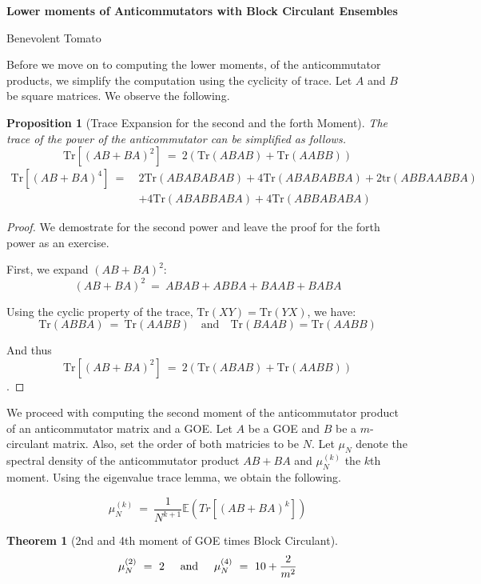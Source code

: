 \documentclass{article}
\newcommand{\textAnd}{
    {
        \hspace{5mm}
        \textrm{and}
        \hspace{5mm}
    }
}
\newtheorem{theorem}{Theorem}
\newtheorem{prop}{Proposition}
\begin{document}
\begin{center}
    \Large
    \textbf{Lower moments of Anticommutators with Block Circulant Ensembles}

    \large
    Benevolent Tomato
\end{center}


Before we move on to computing the lower moments, of the 
anticommutator products, we simplify the computation using the 
cyclicity of trace. 
Let \(A\) and \(B\) be square matrices. We observe the following. 

\begin{prop}[Trace Expansion for the second and the forth Moment]
The trace of the power of the anticommutator can be simplified as follows. 
\[
\text{Tr}[(AB + BA)^2]\ =\ 2(\text{Tr}(ABAB) + \text{Tr}(AABB))
\]
\[
\begin{aligned}
\text{Tr}[(AB + BA)^4] \ =\ & 2 \text{Tr}(ABABABAB) + 4 \text{Tr}(ABABABBA) + 2 \text{tr}(ABBAABBA) \\
& + 4 \text{Tr}(ABABBABA) + 4 \text{Tr}(ABBABABA)
\end{aligned}
\]
\end{prop}
\begin{proof}
We demostrate for the second power and leave the proof for the forth 
power as an exercise. 

First, we expand \((AB + BA)^2\):
\[
(AB + BA)^2 \ =\  ABAB + ABBA + BAAB + BABA
\]

Using the cyclic property of the trace, \(\text{Tr}(XY) = \text{Tr}(YX)\), we have:
\[
\text{Tr}(ABBA) \ =\ \text{Tr}(AABB) \quad \text{and} \quad \text{Tr}(BAAB) = \text{Tr}(AABB)
\]

And thus 
\[
\text{Tr}[(AB + BA)^2] \ =\ 2(\text{Tr}(ABAB) + \text{Tr}(AABB))
\]. 

\end{proof}

We proceed with computing the second moment of the 
anticommutator product of an anticommutator matrix 
and a GOE. Let $A$ be a GOE and $B$ be a $m$-circulant matrix. 
Also, set the order of both matricies to be $N$. 
Let $\mu_N$ denote the spectral density of the anticommutator product 
$AB + BA$ and $\mu_N^{(k)}$ the $k$th moment. 
Using 
the eigenvalue trace lemma, we obtain the following. 

\begin{equation}
    \mu_N^{(k)} \ = \  \frac 1 {N^{k + 1}} \mathbb{E}(Tr[(AB+BA)^k])
\end{equation}

\begin{theorem}[2nd and 4th moment of GOE times Block Circulant]
    \[
        \mu_N^{(2)} \ =\ 2 \textAnd 
        \mu_N^{(4)} \ =\ 10 + \frac 2 {m^2}
    \]
\end{theorem}
\end{document}
